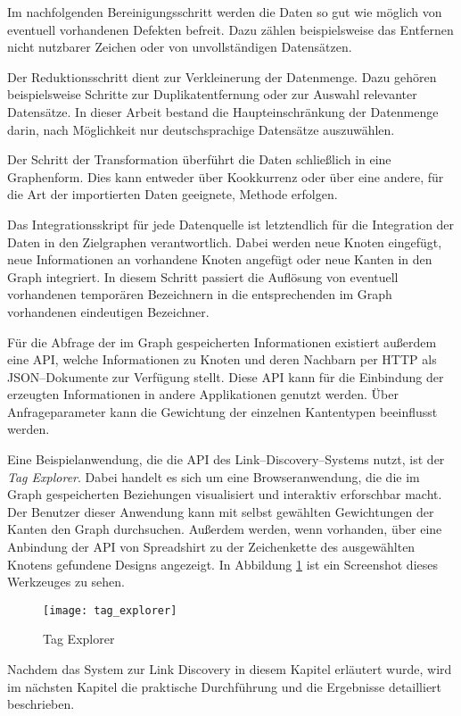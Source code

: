 Im nachfolgenden Bereinigungsschritt werden die Daten so gut wie möglich von eventuell vorhandenen Defekten befreit. Dazu zählen beispielsweise das Entfernen nicht nutzbarer Zeichen oder von unvollständigen Datensätzen.

Der Reduktionsschritt dient zur Verkleinerung der Datenmenge. Dazu gehören beispielsweise Schritte zur Duplikatentfernung oder zur Auswahl relevanter Datensätze. In dieser Arbeit bestand die Haupteinschränkung der Datenmenge darin, nach Möglichkeit nur deutschsprachige Datensätze auszuwählen.

Der Schritt der Transformation überführt die Daten schließlich in eine Graphenform. Dies kann entweder über Kookkurrenz oder über eine andere, für die Art der importierten Daten geeignete, Methode erfolgen.

Das Integrationsskript für jede Datenquelle ist letztendlich für die Integration der Daten in den Zielgraphen verantwortlich. Dabei werden neue Knoten eingefügt, neue Informationen an vorhandene Knoten angefügt oder neue Kanten in den Graph integriert. In diesem Schritt passiert die Auflösung von eventuell vorhandenen temporären Bezeichnern in die entsprechenden im Graph vorhandenen eindeutigen Bezeichner.

Für die Abfrage der im Graph gespeicherten Informationen existiert außerdem eine API, welche Informationen zu Knoten und deren Nachbarn per HTTP als JSON--Dokumente zur Verfügung stellt. Diese API kann für die Einbindung der erzeugten Informationen in andere Applikationen genutzt werden. Über Anfrageparameter kann die Gewichtung der einzelnen Kantentypen beeinflusst werden.

Eine Beispielanwendung, die die API des Link--Discovery--Systems nutzt, ist der \emph{Tag Explorer}. Dabei handelt es sich um eine Browseranwendung, die die im Graph gespeicherten Beziehungen visualisiert und interaktiv erforschbar macht. Der Benutzer dieser Anwendung kann mit selbst gewählten Gewichtungen der Kanten den Graph durchsuchen. Außerdem werden, wenn vorhanden, über eine Anbindung der API von Spreadshirt zu der Zeichenkette des ausgewählten Knotens gefundene Designs angezeigt. In Abbildung \ref{fig:tag_explorer} ist ein Screenshot dieses Werkzeuges zu sehen.

\begin{figure}
\centering
\texttt{[image: tag\_explorer]}
\caption{Tag Explorer}
\label{fig:tag_explorer}
\end{figure}

Nachdem das System zur Link Discovery in diesem Kapitel erläutert wurde, wird im nächsten Kapitel die praktische Durchführung und die Ergebnisse detailliert beschrieben.